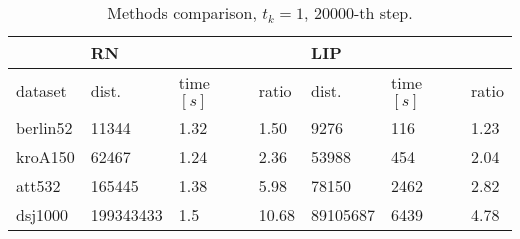 \begin{table}[!htb]
	\centering
	\footnotesize
	\begin{tabular}{l|lll|lll|}
		\cline{2-7}
		& \multicolumn{3}{l|}{RN}                                        & \multicolumn{3}{l|}{LIP}                                          \\ \hline
		\multicolumn{1}{|l|}{dataset}  & \multicolumn{1}{l|}{dist.}     & \multicolumn{1}{l|}{time $[s]$} & ratio & \multicolumn{1}{l|}{dist.}    & \multicolumn{1}{l|}{time $[s]$} & ratio \\ \hline
		\multicolumn{1}{|l|}{berlin52} & \multicolumn{1}{l|}{11344}     & \multicolumn{1}{l|}{1.32} & 1.50  & \multicolumn{1}{l|}{9276}     & \multicolumn{1}{l|}{116}  & 1.23  \\ \hline
		\multicolumn{1}{|l|}{kroA150}  & \multicolumn{1}{l|}{62467}     & \multicolumn{1}{l|}{1.24} & 2.36  & \multicolumn{1}{l|}{53988}    & \multicolumn{1}{l|}{454}  & 2.04  \\ \hline
		\multicolumn{1}{|l|}{att532}   & \multicolumn{1}{l|}{165445}    & \multicolumn{1}{l|}{1.38} & 5.98  & \multicolumn{1}{l|}{78150}    & \multicolumn{1}{l|}{2462} & 2.82  \\ \hline
		\multicolumn{1}{|l|}{dsj1000}  & \multicolumn{1}{l|}{199343433} & \multicolumn{1}{l|}{1.5}  & 10.68 & \multicolumn{1}{l|}{89105687} & \multicolumn{1}{l|}{6439} & 4.78  \\ \hline
	\end{tabular}
	\caption{Methods comparison, $t_k=1$, 20000-th step.}
\end{table}
